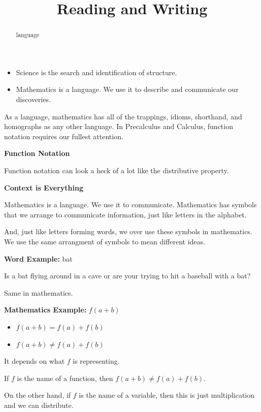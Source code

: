 \documentclass{ximera}
\title{Reading and Writing}
\begin{document}
\begin{abstract}
language
\end{abstract}
\maketitle



\begin{itemize}
\item Science is the search and identification of structure. 

\item Mathematics is a language. We use it to describe and communicate our discoveries.
\end{itemize}

As a language, mathematics has all of the trappings, idioms, shorthand, and homographs as any other language. In Precalculus and Calculus, function notation requires our fullest attention.  


\begin{warning} \textbf{\textcolor{red!70!black}{Function Notation}}  


Function notation can look a heck of a lot like the distributive property. 


\begin{center}

\textbf{\textcolor{purple!85!blue}{Context is Everything}}

\end{center}


Mathematics is a language.  We use it to communicate.  Mathematics has symbols that we arrange to communicate information, just like letters in the alphabet. 

And, just like letters forming words, we over use these symbols in mathematics.  We use the same arrangment of symbols to mean different ideas.

\textbf{Word Example:} bat 

Is a bat flying around in a cave or are your trying to hit a baseball with a bat? 


Same in mathematics.



\textbf{Mathematics Example:} $f(a + b)$ 

\begin{itemize}
	\item $f(a + b) = f(a) + f(b)$
	\item $f(a + b) \ne f(a) + f(b)$
\end{itemize}


It depends on what $f$ is representing. 

If $f$ is the name of a function, then $f(a + b) \ne f(a) + f(b)$.  

On the other hand, if $f$ is the name of a variable, then this is just multiplication and we can distribute.



\end{warning}
\end{document}
